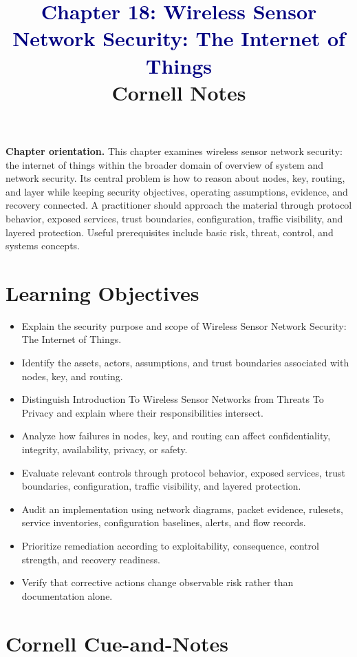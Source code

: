 \documentclass[11pt]{article}
\title{\textcolor{Navy}{Chapter 18: Wireless Sensor Network Security: The Internet of Things}\\[2mm]\large Cornell Notes}
\author{}
\date{}
\begin{document}
\maketitle
\thispagestyle{fancy}
\vspace{-1.5em}
\begin{orientationbox}
\textbf{Chapter orientation.} This chapter examines wireless sensor network security: the internet of things within the broader domain of overview of system and network security. Its central problem is how to reason about nodes, key, routing, and layer while keeping security objectives, operating assumptions, evidence, and recovery connected. A practitioner should approach the material through protocol behavior, exposed services, trust boundaries, configuration, traffic visibility, and layered protection. Useful prerequisites include basic risk, threat, control, and systems concepts.
\end{orientationbox}
\section*{Learning Objectives}
\begin{itemize}
\item Explain the security purpose and scope of Wireless Sensor Network Security: The Internet of Things.
\item Identify the assets, actors, assumptions, and trust boundaries associated with nodes, key, and routing.
\item Distinguish Introduction To Wireless Sensor Networks from Threats To Privacy and explain where their responsibilities intersect.
\item Analyze how failures in nodes, key, and routing can affect confidentiality, integrity, availability, privacy, or safety.
\item Evaluate relevant controls through protocol behavior, exposed services, trust boundaries, configuration, traffic visibility, and layered protection.
\item Audit an implementation using network diagrams, packet evidence, rulesets, service inventories, configuration baselines, alerts, and flow records.
\item Prioritize remediation according to exploitability, consequence, control strength, and recovery readiness.
\item Verify that corrective actions change observable risk rather than documentation alone.
\end{itemize}
\section*{Cornell Cue-and-Notes}
\end{document}

